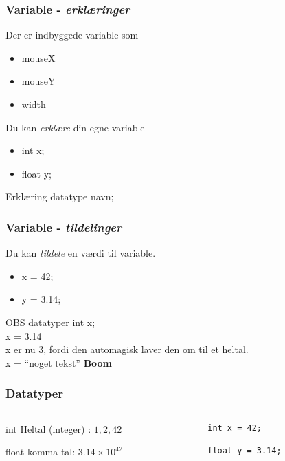 \documentclass{beamer}
\begin{document}
\begin{frame}
  \frametitle{Variable - \emph{erklæringer}}
  
  Der er indbyggede variable som
  \begin{itemize}
  \item mouseX
  \item mouseY
  \item width
  \end{itemize}

  Du kan \emph{erklære} din egne variable
  \begin{itemize}
  \item int x;
  \item float y;
  \end{itemize}

  \begin{block}{Erklæring}
    datatype navn;
  \end{block}

\end{frame}

\begin{frame}
  \frametitle{Variable - \emph{tildelinger}}
  
  Du kan \emph{tildele} en værdi til variable.
  \begin{itemize}
  \item x = 42;
  \item y = 3.14;
  \end{itemize}


  \begin{block}{OBS datatyper}
    int x; \\
    x = 3.14 \\
    x er nu 3, fordi den automagisk laver den om til et heltal. \\
    \sout{x = ``noget tekst''} \textbf{Boom}
  \end{block}

\end{frame}



\begin{frame}[fragile]
  \frametitle{Datatyper}
  \begin{columns}
    \begin{column}{0.4\textwidth}
      \begin{block}{int}
        Heltal (integer) : $1,2,42$
      \end{block}
      \begin{block}{float}
        komma tal: $3.14 \times 10^{42}$
      \end{block}

    \end{column}
    \begin{column}{0.6\textwidth}    
\begin{verbatim}
int x = 42;

float y = 3.14;
\end{verbatim}

    \end{column}
  \end{columns}  
\end{frame}
\end{document}
